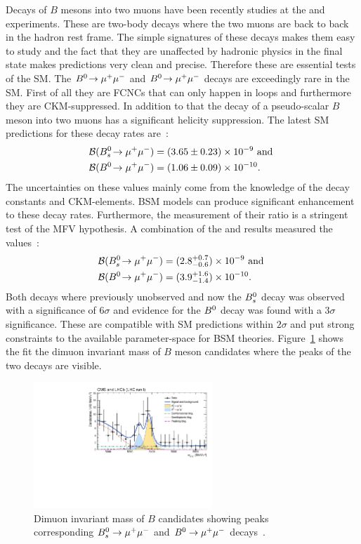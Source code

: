 Decays of $B$ mesons into two muons have been recently studies at the \lhcb and \cms experiments.
These are two-body decays where the two muons are back to back in the hadron rest frame.
The simple signatures of these decays makes them easy to study and the fact that they
are unaffected by hadronic physics in the final state makes predictions very clean and precise.
Therefore these are essential tests of the SM.
The $B^0\!\rightarrow \mu^+\mu^-$ and $B^0\!\rightarrow \mu^+\mu^-$ decays are exceedingly rare in the SM.
First of all they are FCNCs that can only happen in loops and furthermore they are CKM-suppressed.
In addition to that the decay of a pseudo-scalar $B$ meson into two muons has a significant helicity
suppression. The latest SM predictions for these decay rates are~\cite{Bobeth:2013uxa}:
%
\begin{align}
\mathcal{B}(B^0_s\!\rightarrow \mu^+\mu^-) &= (3.65 \pm 0.23) \times 10^{-9} \text{ and } \\
\mathcal{B}(B^0\!\rightarrow \mu^+\mu^-) &= (1.06 \pm 0.09) \times 10^{-10}.
\end{align}
%
The uncertainties on these values mainly come from the knowledge of the decay constants and 
CKM-elements. BSM models can produce significant enhancement to these decay rates.
Furthermore, the measurement of their ratio is a stringent test of the MFV hypothesis.
A combination of the \lhcb and \cms results measured the values~\cite{CMS:2014xfa}:
%
\begin{align}
\mathcal{B}(B^0_s\!\rightarrow \mu^+\mu^-) &= (2.8^{+0.7}_{-0.6}) \times 10^{-9} \text{ and } \\
\mathcal{B}(B^0\!\rightarrow \mu^+\mu^-) &= (3.9^{+1.6}_{-1.4}) \times 10^{-10}.
\end{align}
%
Both decays where previously unobserved and now the $B^0_s$ decay was observed
with a significance of $6\sigma$ and evidence for the $B^0$ decay was found
with a $3\sigma$ significance. These are compatible with SM predictions within 
$2\sigma$ and put strong constraints to the available parameter-space for BSM 
theories. Figure~\ref{fig:bsmumu} shows the fit the dimuon invariant mass
of $B$ meson candidates where the peaks of the two decays are visible.
%
\begin{figure}[h!]
\centering
\includegraphics[width=0.6\textwidth]{Introduction/figs/CMSLHCb_EDfig2.pdf}
\caption{Dimuon invariant mass of $B$ candidates showing peaks corresponding 
$B^0_s\rightarrow\mu^+\mu^-$ and $B^0\rightarrow\mu^+\mu^-$ decays~\cite{CMS:2014xfa}.}
\label{fig:bsmumu}
\end{figure}


